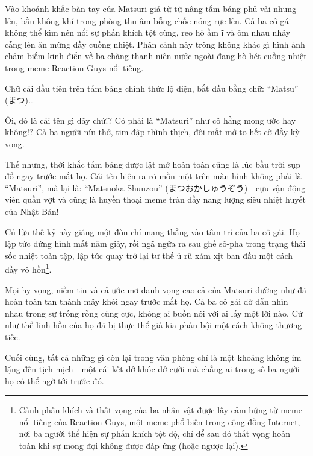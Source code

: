\documentclass[../main.tex]{subfiles}
\begin{document}
Vào khoảnh khắc bàn tay của Matsuri giả từ từ nâng tấm bảng phủ vải nhung lên, bầu không khí trong phòng thu âm bỗng chốc nóng rực lên. Cả ba cô gái không thể kìm nén nổi sự phấn khích tột cùng, reo hò ầm ĩ và ôm nhau nhảy cẫng lên ăn mừng đầy cuồng nhiệt. Phân cảnh này trông không khác gì hình ảnh châm biếm kinh điển về ba chàng thanh niên nước ngoài đang hò hét cuồng nhiệt trong meme Reaction Guys nổi tiếng.

Chữ cái đầu tiên trên tấm bảng chính thức lộ diện, bắt đầu bằng chữ: ``Matsu'' (まつ)\dots


Ôi, đó là cái tên gì đây chứ!? Có phải là ``Matsuri'' như cô hằng mong ước hay không!? Cả ba người nín thở, tim đập thình thịch, đôi mắt mở to hết cỡ đầy kỳ vọng.

Thế nhưng, thời khắc tấm bảng được lật mở hoàn toàn cũng là lúc bầu trời sụp đổ ngay trước mắt họ. Cái tên hiện ra rõ mồn một trên màn hình không phải là ``Matsuri'', mà lại là: ``Matsuoka Shuuzou'' (まつおかしゅうぞう) - cựu vận động viên quần vợt và cũng là huyền thoại meme tràn đầy năng lượng siêu nhiệt huyết của Nhật Bản!

Cú lừa thế kỷ này giáng một đòn chí mạng thẳng vào tâm trí của ba cô gái. Họ lập tức đứng hình mất năm giây, rồi ngã ngửa ra sau ghế sô-pha trong trạng thái sốc nhiệt toàn tập, lập tức quay trở lại tư thế ủ rũ xám xịt ban đầu một cách đầy vô hồn\footnote{Cảnh phấn khích và thất vọng của ba nhân vật được lấy cảm hứng từ meme nổi tiếng của \href{https://knowyourmeme.com/memes/reaction-guys-gaijin-4koma}{Reaction Guys}, một meme phổ biến trong cộng đồng Internet, nơi ba người thể hiện sự phấn khích tột độ, chỉ để sau đó thất vọng hoàn toàn khi sự mong đợi không được đáp ứng (hoặc ngược lại).}.


Mọi hy vọng, niềm tin và cả ước mơ danh vọng cao cả của Matsuri dường như đã hoàn toàn tan thành mây khói ngay trước mắt họ. Cả ba cô gái đờ đẫn nhìn nhau trong sự trống rỗng cùng cực, không ai buồn nói với ai lấy một lời nào. Cứ như thể linh hồn của họ đã bị thực thể giả kia phản bội một cách không thương tiếc.

Cuối cùng, tất cả những gì còn lại trong văn phòng chỉ là một khoảng không im lặng đến tịch mịch - một cái kết dở khóc dở cười mà chẳng ai trong số ba người họ có thể ngờ tới trước đó.
\omk
{}
\end{document}
